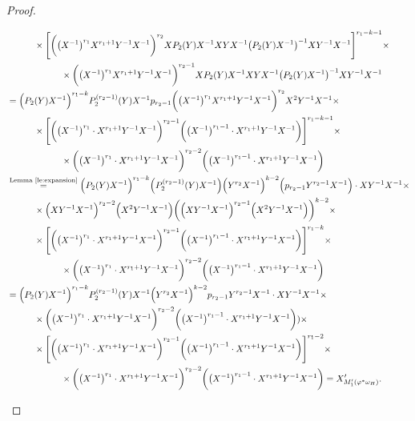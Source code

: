 \documentclass{amsart}
\begin{document}
\begin{proof}
\begin{itemize}
\begin{align*}
   &\quad\quad\quad\times\Bigg[\bigg(\big(X^{-1}\big)^{r_1}X^{r_1+1}Y^{-1}X^{-1}\bigg)^{r_2}XP_2(Y)X^{-1}XYX^{-1}\big(P_2(Y)X^{-1}\big)^{-1}XY^{-1}X^{-1}\Bigg]^{r_1-k-1}\times\\
   &\quad\quad\quad\quad\quad\quad\times\bigg(\big(X^{-1}\big)^{r_1}X^{r_1+1}Y^{-1}X^{-1}\bigg)^{r_2-1}XP_2(Y)X^{-1}XYX^{-1}\big(P_2(Y)X^{-1}\big)^{-1}XY^{-1}X^{-1}\\
   &=\Big(P_2(Y)X^{-1}\Big)^{r_1-k}P_2^{(r_2-1)}(Y)X^{-1}p_{r_2-1}\bigg(\big(X^{-1}\big)^{r_1}X^{r_1+1}Y^{-1}X^{-1}\bigg)^{r_2}X^2Y^{-1}X^{-1}\times\\
   &\quad\quad\quad\times\Bigg[\bigg(\big(X^{-1}\big)^{r_1}\cdot X^{r_1+1}Y^{-1}X^{-1}\bigg)^{r_2-1}\bigg(\big(X^{-1}\big)^{r_1-1}\cdot X^{r_1+1}Y^{-1}X^{-1}\bigg)\Bigg]^{r_1-k-1}\times\\
   &\quad\quad\quad\quad\quad\quad\times\bigg(\big(X^{-1}\big)^{r_1}\cdot X^{r_1+1}Y^{-1}X^{-1}\bigg)^{r_2-2}\bigg(\big(X^{-1}\big)^{r_1-1}\cdot X^{r_1+1}Y^{-1}X^{-1}\bigg)\\
   &\stackrel{\text{Lemma~\ref{le:expansion}}}{=}\Big(P_2(Y)X^{-1}\Big)^{r_1-k}\Big(P_2^{(r_2-1)}(Y)X^{-1}\Big)\Big(Y^{r_2}X^{-1}\Big)^{k-2}\Big(p_{r_2-1}Y^{r_2-1}X^{-1}\Big)\cdot XY^{-1}X^{-1}\times\\
   &\quad\quad\quad\times \Big(XY^{-1}X^{-1}\Big)^{r_2-2}\Big(X^2Y^{-1}X^{-1}\Big)\bigg(\Big(XY^{-1}X^{-1}\Big)^{r_2-1}\Big(X^2Y^{-1}X^{-1}\Big)\bigg)^{k-2}\times\\
   &\quad\quad\quad\times\Bigg[\bigg(\big(X^{-1}\big)^{r_1}\cdot X^{r_1+1}Y^{-1}X^{-1}\bigg)^{r_2-1}\bigg(\big(X^{-1}\big)^{r_1-1}\cdot X^{r_1+1}Y^{-1}X^{-1}\bigg)\Bigg]^{r_1-k}\times\\
   &\quad\quad\quad\quad\quad\quad\times\bigg(\big(X^{-1}\big)^{r_1}\cdot X^{r_1+1}Y^{-1}X^{-1}\bigg)^{r_2-2}\bigg(\big(X^{-1}\big)^{r_1-1}\cdot X^{r_1+1}Y^{-1}X^{-1}\bigg)\\
   &=\Big(P_2(Y)X^{-1}\Big)^{r_1-k}P_2^{(r_2-1)}(Y)X^{-1}\Big(Y^{r_2}X^{-1}\Big)^{k-2}p_{r_2-1}Y^{r_2-1}X^{-1}\cdot XY^{-1}X^{-1}\times\\
   &\quad\quad\quad\times \bigg(\big(X^{-1}\big)^{r_1}\cdot X^{r_1+1}Y^{-1}X^{-1}\bigg)^{r_2-2}\bigg(\big(X^{-1}\big)^{r_1-1}\cdot X^{r_1+1}Y^{-1}X^{-1}\bigg))\times\\
   &\quad\quad\quad\times\Bigg[\bigg(\big(X^{-1}\big)^{r_1}\cdot X^{r_1+1}Y^{-1}X^{-1}\bigg)^{r_2-1}\bigg(\big(X^{-1}\big)^{r_1-1}\cdot X^{r_1+1}Y^{-1}X^{-1}\bigg)\Bigg]^{r_1-2}\times\\
   &\quad\quad\quad\quad\quad\quad\times\bigg(\big(X^{-1}\big)^{r_1}\cdot X^{r_1+1}Y^{-1}X^{-1}\bigg)^{r_2-2}\bigg(\big(X^{-1}\big)^{r_1-1}\cdot X^{r_1+1}Y^{-1}X^{-1}\bigg)=X'_{M_1'(\varphi^* \omega_H)}.
  \end{align*}
  \end{itemize}
  

\end{proof}
\end{document}
